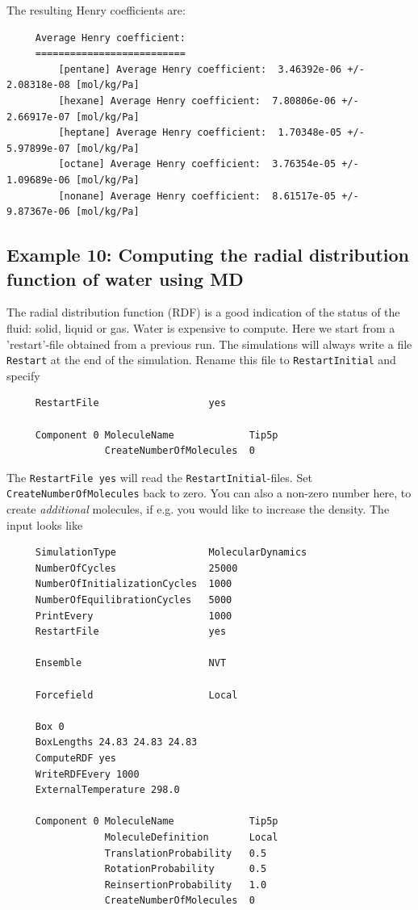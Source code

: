 The resulting Henry coefficients are:
\begin{tiny}
\begin{verbatim}
     Average Henry coefficient:
     ==========================
         [pentane] Average Henry coefficient:  3.46392e-06 +/- 2.08318e-08 [mol/kg/Pa]
         [hexane] Average Henry coefficient:  7.80806e-06 +/- 2.66917e-07 [mol/kg/Pa]
         [heptane] Average Henry coefficient:  1.70348e-05 +/- 5.97899e-07 [mol/kg/Pa]
         [octane] Average Henry coefficient:  3.76354e-05 +/- 1.09689e-06 [mol/kg/Pa]
         [nonane] Average Henry coefficient:  8.61517e-05 +/- 9.87367e-06 [mol/kg/Pa]
\end{verbatim}
\end{tiny}

\subsection*{Example 10: Computing the radial distribution function of water using MD}

The radial distribution function (RDF) is a good indication of the status of the fluid: solid, liquid or gas.
Water is expensive to compute. Here we start from a 'restart'-file obtained from a previous run.
The simulations will always write a file \verb+Restart+
at the end of the simulation. Rename this file to \verb+RestartInitial+ and specify
\begin{tiny}
\begin{verbatim}
     RestartFile                   yes

     Component 0 MoleculeName             Tip5p
                 CreateNumberOfMolecules  0
\end{verbatim}
\end{tiny}
The \verb+RestartFile yes+ will read the \verb+RestartInitial+-files. Set \verb+CreateNumberOfMolecules+ back to zero.
You can also a non-zero number here, to create \emph{additional} molecules, if e.g. you would like to increase the density.
The input looks like
\begin{tiny}
\begin{verbatim}
     SimulationType                MolecularDynamics
     NumberOfCycles                25000
     NumberOfInitializationCycles  1000
     NumberOfEquilibrationCycles   5000
     PrintEvery                    1000
     RestartFile                   yes
     
     Ensemble                      NVT
     
     Forcefield                    Local
     
     Box 0
     BoxLengths 24.83 24.83 24.83
     ComputeRDF yes
     WriteRDFEvery 1000
     ExternalTemperature 298.0
     
     Component 0 MoleculeName             Tip5p
                 MoleculeDefinition       Local
                 TranslationProbability   0.5
                 RotationProbability      0.5
                 ReinsertionProbability   1.0
                 CreateNumberOfMolecules  0
\end{verbatim}
\end{tiny}

